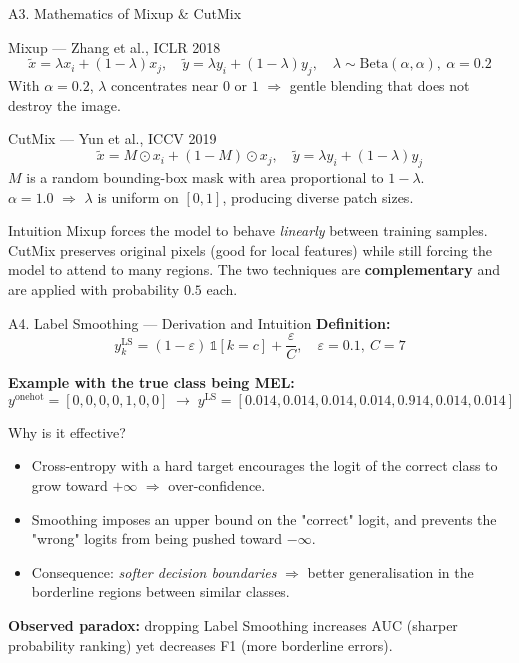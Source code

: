 \documentclass[10pt, aspectratio=169]{beamer}
\begin{document}
\begin{frame}{A3. Mathematics of Mixup \& CutMix}
    \footnotesize
    \begin{block}{Mixup --- Zhang et al., ICLR 2018}
        \[
            \tilde{x} = \lambda x_i + (1-\lambda) x_j, \quad
            \tilde{y} = \lambda y_i + (1-\lambda) y_j, \quad
            \lambda \sim \mathrm{Beta}(\alpha, \alpha),\ \alpha=0.2
        \]
        With $\alpha=0.2$, $\lambda$ concentrates near $0$ or $1$ $\Rightarrow$ gentle blending that does not destroy the image.
    \end{block}

    \begin{block}{CutMix --- Yun et al., ICCV 2019}
        \[
            \tilde{x} = M \odot x_i + (1-M) \odot x_j, \quad
            \tilde{y} = \lambda y_i + (1-\lambda) y_j
        \]
        $M$ is a random bounding-box mask with area proportional to $1-\lambda$.\\
        $\alpha=1.0$ $\Rightarrow$ $\lambda$ is uniform on $[0,1]$, producing diverse patch sizes.
    \end{block}

    \begin{block}{Intuition}
        Mixup forces the model to behave \textit{linearly} between training samples. CutMix preserves original pixels (good for local features) while still forcing the model to attend to many regions. The two techniques are \textbf{complementary} and are applied with probability $0.5$ each.
    \end{block}
\end{frame}

\begin{frame}{A4. Label Smoothing --- Derivation and Intuition}
    \footnotesize
    \textbf{Definition:}
    \[
        y^{\text{LS}}_k = (1 - \varepsilon)\, \mathbb{1}[k = c] + \frac{\varepsilon}{C}, \quad \varepsilon = 0.1,\ C=7
    \]

    \textbf{Example with the true class being MEL:}
    \[
        y^{\text{onehot}} = [0,0,0,0,1,0,0] \;\rightarrow\; y^{\text{LS}} = [0.014, 0.014, 0.014, 0.014, 0.914, 0.014, 0.014]
    \]

    \begin{block}{Why is it effective?}
        \begin{itemize}
            \item Cross-entropy with a hard target encourages the logit of the correct class to grow toward $+\infty$ $\Rightarrow$ over-confidence.
            \item Smoothing imposes an upper bound on the "correct" logit, and prevents the "wrong" logits from being pushed toward $-\infty$.
            \item Consequence: \textit{softer decision boundaries} $\Rightarrow$ better generalisation in the borderline regions between similar classes.
        \end{itemize}
    \end{block}

    \textbf{Observed paradox:} dropping Label Smoothing increases AUC (sharper probability ranking) yet decreases F1 (more borderline errors).
\end{frame}
\end{document}
